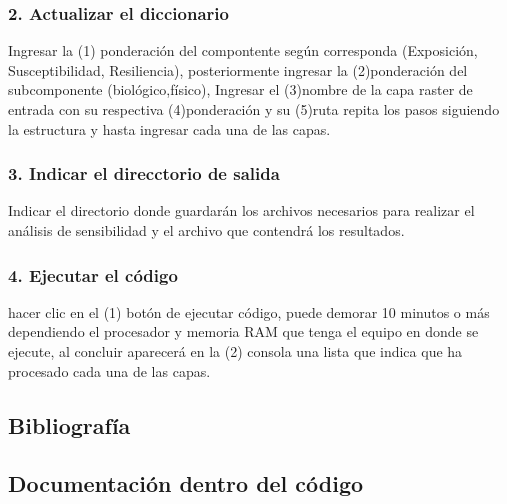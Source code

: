 \documentclass[letterpaper,10pt,spanish]{sphinxmanual}
\begin{document}
\subsubsection{2. Actualizar el diccionario}
\label{\detokenize{analisis:actualizar-el-diccionario}}
Ingresar la (1) ponderación del compontente según corresponda (Exposición, Susceptibilidad, Resiliencia), posteriormente
ingresar la (2)ponderación del subcomponente (biológico,físico),
Ingresar el (3)nombre de la capa raster de entrada con su respectiva (4)ponderación y su (5)ruta
repita los pasos siguiendo la estructura y hasta ingresar cada una de las capas.

\noindent{}


\subsubsection{3. Indicar el direcctorio de salida}
\label{\detokenize{analisis:indicar-el-direcctorio-de-salida}}
Indicar el directorio donde guardarán los archivos necesarios para realizar el análisis de sensibilidad
y el archivo   que contendrá los resultados.

\begin{sphinxVerbatim}[commandchars=\\\{\}]
  
\end{sphinxVerbatim}


\subsubsection{4. Ejecutar el código}
\label{\detokenize{analisis:ejecutar-el-codigo}}
hacer clic en el (1) botón de ejecutar código, puede demorar 10 minutos o más dependiendo el procesador y
memoria RAM que tenga el equipo en donde se ejecute, al concluir aparecerá en la (2) consola una lista que indica que
ha procesado cada una de las capas.

\noindent{}


\subsection{Bibliografía}
\label{\detokenize{analisis:bibliografia}}

\subsection{Documentación dentro del código}
\label{\detokenize{analisis:documentacion-dentro-del-codigo}}
\end{document}
